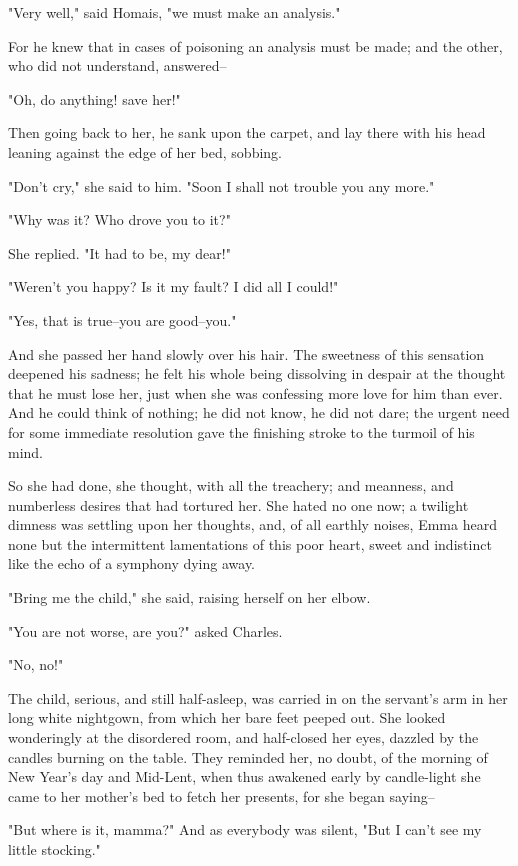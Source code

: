 \documentclass[11pt,twocolumn]{ltugboat}
\begin{document}
"Very well," said Homais, "we must make an analysis."

For he knew that in cases of poisoning an analysis must be made; and the
other, who did not understand, answered--

"Oh, do anything! save her!"

Then going back to her, he sank upon the carpet, and lay there with his
head leaning against the edge of her bed, sobbing.

"Don't cry," she said to him. "Soon I shall not trouble you any more."

"Why was it? Who drove you to it?"

She replied. "It had to be, my dear!"

"Weren't you happy? Is it my fault? I did all I could!"

"Yes, that is true--you are good--you."

And she passed her hand slowly over his hair. The sweetness of this
sensation deepened his sadness; he felt his whole being dissolving
in despair at the thought that he must lose her, just when she was
confessing more love for him than ever. And he could think of nothing;
he did not know, he did not dare; the urgent need for some immediate
resolution gave the finishing stroke to the turmoil of his mind.

So she had done, she thought, with all the treachery; and meanness,
and numberless desires that had tortured her. She hated no one now; a
twilight dimness was settling upon her thoughts, and, of all earthly
noises, Emma heard none but the intermittent lamentations of this poor
heart, sweet and indistinct like the echo of a symphony dying away.

"Bring me the child," she said, raising herself on her elbow.

"You are not worse, are you?" asked Charles.

"No, no!"

The child, serious, and still half-asleep, was carried in on the
servant's arm in her long white nightgown, from which her bare
feet peeped out. She looked wonderingly at the disordered room, and
half-closed her eyes, dazzled by the candles burning on the table. They
reminded her, no doubt, of the morning of New Year's day and Mid-Lent,
when thus awakened early by candle-light she came to her mother's bed to
fetch her presents, for she began saying--

"But where is it, mamma?" And as everybody was silent, "But I can't see
my little stocking."
\end{document}
